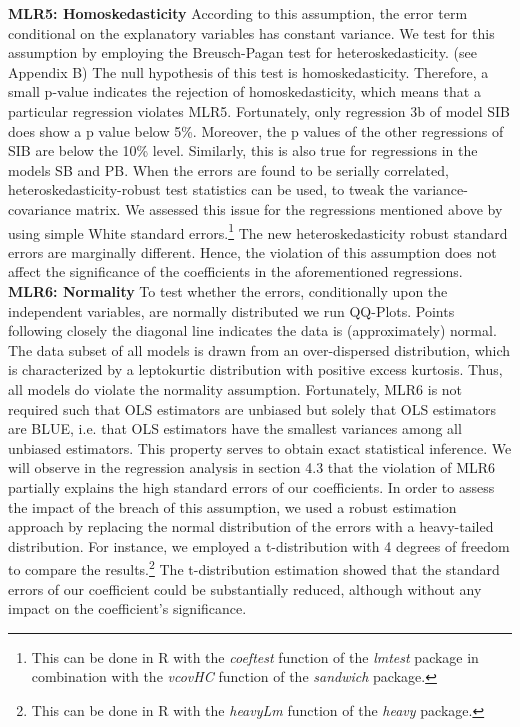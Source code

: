 \textbf{MLR5: Homoskedasticity
}
According to this assumption, the error term conditional on the explanatory variables has constant variance. We test for this assumption by employing the Breusch-Pagan test for heteroskedasticity. (see Appendix B) The null hypothesis of this test is homoskedasticity. Therefore, a small p-value indicates the rejection of homoskedasticity, which means that a particular regression violates MLR5. \citep[p. 305]{wooldridge} Fortunately, only regression 3b of model SIB does show a p value below 5\%. Moreover, the p values of the other regressions of SIB are below the 10\% level. Similarly, this is also true for regressions in the models SB and PB. When the errors are found to be serially correlated, heteroskedasticity-robust test statistics can be used, to tweak the variance-covariance matrix. \citep[p. 464]{wooldridge} We assessed this issue for the regressions mentioned above by using simple White standard errors.\footnote{This can be done in R with the \textit{coeftest} function of the \textit{lmtest} package in combination with the \textit{vcovHC} function of the \textit{sandwich} package.} The new heteroskedasticity robust standard errors are marginally different. Hence, the violation of this assumption does not affect the significance of the coefficients in the aforementioned regressions.  \\ 

\textbf{MLR6: Normality
}
To test whether the errors, conditionally upon the independent variables, are normally distributed we run QQ-Plots. Points following closely the diagonal line indicates the data is (approximately) normal. The data subset of all models is drawn from an over-dispersed distribution, which is characterized by a leptokurtic distribution with positive excess kurtosis. Thus, all models do violate the normality assumption. Fortunately, MLR6 is not required such that OLS estimators are unbiased but solely that OLS estimators are BLUE, i.e. that OLS estimators have the smallest variances among all unbiased estimators. This property serves to obtain exact statistical inference. We will observe in the regression analysis in section 4.3 that the violation of MLR6 partially explains the high standard errors of our coefficients. In order to assess the impact of the breach of this assumption, we used a robust estimation approach by replacing the normal distribution of the errors with a heavy-tailed distribution.
For instance, we employed a t-distribution with 4 degrees of freedom to compare the results.\footnote{This can be done in R with the \textit{heavyLm} function of the \textit{heavy} package.} The t-distribution estimation showed that the standard errors of our coefficient could be substantially reduced, although without any impact on the coefficient's significance. \\


